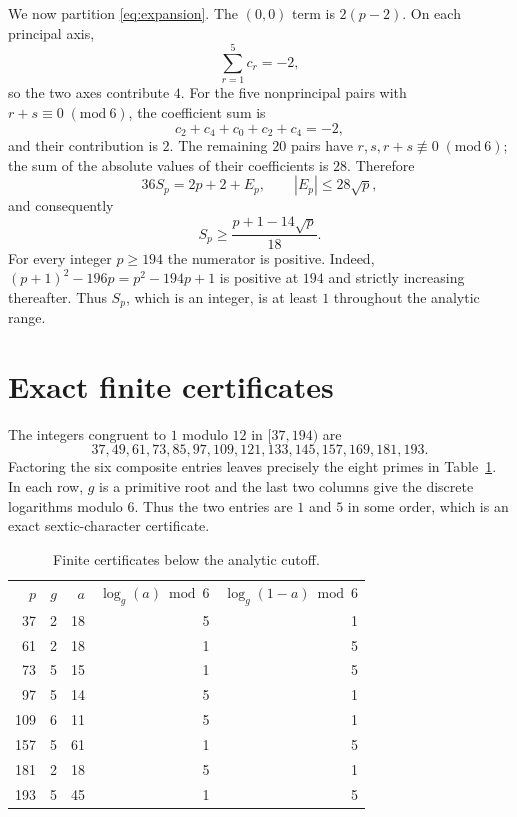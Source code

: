 \documentclass[11pt]{article}
\begin{document}
We now partition \eqref{eq:expansion}.  The $(0,0)$ term is $2(p-2)$.
On each principal axis,
\[
 \sum_{r=1}^{5}c_r=-2,
\]
so the two axes contribute $4$.  For the five nonprincipal pairs with
$r+s\equiv0\;(\mathrm{mod}\ 6)$, the coefficient sum is
\[
 c_2+c_4+c_0+c_2+c_4=-2,
\]
and their contribution is $2$.  The remaining $20$ pairs have
$r,s,r+s\not\equiv0\;(\mathrm{mod}\ 6)$; the sum of the absolute values of their
coefficients is $28$.  Therefore
\[
 36S_p=2p+2+E_p,\qquad |E_p|\leq28\sqrt p,
\]
and consequently
\begin{equation}\label{eq:bound}
 S_p\geq\frac{p+1-14\sqrt p}{18}.
\end{equation}
For every integer $p\geq194$ the numerator is positive.  Indeed,
$(p+1)^2-196p=p^2-194p+1$ is positive at $194$ and strictly increasing
thereafter.  Thus $S_p$, which is an integer, is at least $1$ throughout the
analytic range.

\section{Exact finite certificates}

The integers congruent to $1$ modulo $12$ in $[37,194)$ are
\[
37,49,61,73,85,97,109,121,133,145,157,169,181,193.
\]
Factoring the six composite entries leaves precisely the eight primes in
Table~\ref{tab:cert}.  In each row, $g$ is a primitive root and the last two
columns give the discrete logarithms modulo $6$.  Thus the two entries are
$1$ and $5$ in some order, which is an exact sextic-character certificate.

\begin{table}[ht]
\centering
\caption{Finite certificates below the analytic cutoff.}
\label{tab:cert}
\begin{tabular}{rrrrr}
$p$ & $g$ & $a$ & $\log_g(a)\bmod6$ & $\log_g(1-a)\bmod6$\\
37  & 2 & 18 & 5 & 1\\
61  & 2 & 18 & 1 & 5\\
73  & 5 & 15 & 1 & 5\\
97  & 5 & 14 & 5 & 1\\
109 & 6 & 11 & 5 & 1\\
157 & 5 & 61 & 1 & 5\\
181 & 2 & 18 & 5 & 1\\
193 & 5 & 45 & 1 & 5\\
\end{tabular}
\end{table}
\end{document}

